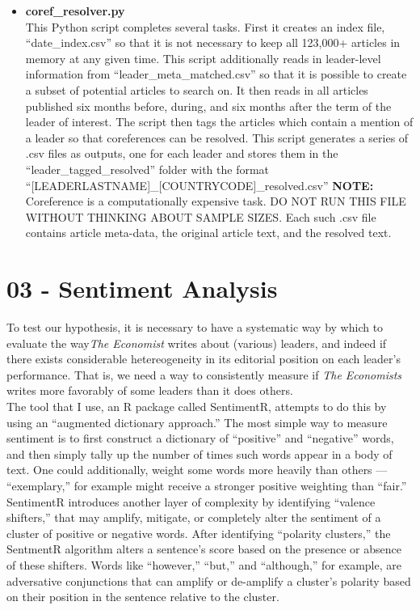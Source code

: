 \documentclass[11pt, letterpaper, twoside]{article}
\begin{document}
\begin{itemize}
    \item \textbf{coref\_resolver.py}\\
    This Python script completes several tasks. First it creates an index file, ``date\_index.csv'' so that it is not necessary to keep all 123,000+ articles in memory at any given time. This script additionally reads in leader-level information from ``leader\_meta\_matched.csv'' so that it is possible to create a subset of potential articles to search on. It then reads in all articles published six months before, during, and six months after the term of the leader of interest. The script then tags the articles which contain a mention of a leader so that coreferences can be resolved. This script generates a series of .csv files as outputs, one for each leader and stores them in the ``leader\_tagged\_resolved'' folder with the format ``[LEADERLASTNAME]\_[COUNTRYCODE]\_resolved.csv'' \textbf{NOTE:} Coreference is a computationally expensive task. DO NOT RUN THIS FILE WITHOUT THINKING ABOUT SAMPLE SIZES. Each such .csv file contains article meta-data, the original article text, and the resolved text.\\
\end{itemize}


\section{03 - Sentiment Analysis}
To test our hypothesis, it is necessary to have a systematic way by which to evaluate the way\textit{The Economist} writes about (various) leaders, and indeed if there exists considerable hetereogeneity in its editorial position on each leader's performance. That is, we need a way to consistently measure if \textit{The Economists} writes more favorably of some leaders than it does others.\\

The tool that I use, an R package called SentimentR, attempts to do this by using an ``augmented dictionary approach.'' \cite{rinker2019sentimentr} The most simple way to measure sentiment is to first construct a dictionary of ``positive'' and ``negative'' words, and then simply tally up the number of times such words appear in a body of text. One could additionally, weight some words more heavily than others --- ``exemplary,'' for example might receive a stronger positive weighting than ``fair.''\\

SentimentR introduces another layer of complexity by identifying ``valence shifters,'' that may amplify, mitigate, or completely alter the sentiment of a cluster of positive or negative words. After identifying ``polarity clusters,'' the SentmentR algorithm alters a sentence's score based on the presence or absence of these shifters. Words like ``however,'' ``but,'' and ``although,'' for example, are adversative conjunctions that can amplify or de-amplify a cluster's polarity based on their position in the sentence relative to the cluster.\\
\end{document}
